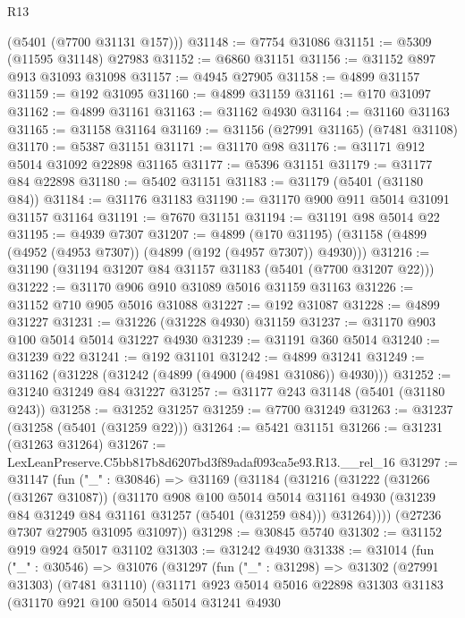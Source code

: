 \begin{lexlean}{R13}
\begin{coremodule}
      (@5401 (@7700 @31131 @157)))
@31148 := @7754 @31086
@31151 := @5309 (@11595 @31148) @27983
@31152 := @6860 @31151
@31156 := @31152 @897 @913 @31093 @31098
@31157 := @4945 @27905
@31158 := @4899 @31157
@31159 := @192 @31095
@31160 := @4899 @31159
@31161 := @170 @31097
@31162 := @4899 @31161
@31163 := @31162 @4930
@31164 := @31160 @31163
@31165 := @31158 @31164
@31169 := @31156 (@27991 @31165) (@7481 @31108)
@31170 := @5387 @31151
@31171 := @31170 @98
@31176 := @31171 @912 @5014 @31092 @22898 @31165
@31177 := @5396 @31151
@31179 := @31177 @84 @22898
@31180 := @5402 @31151
@31183 := @31179 (@5401 (@31180 @84))
@31184 := @31176 @31183
@31190 := @31170 @900 @911 @5014 @31091 @31157 @31164
@31191 := @7670 @31151
@31194 := @31191 @98 @5014 @22
@31195 := @4939 @7307
@31207 := @4899
    (@170 @31195)
    (@31158 (@4899 (@4952 (@4953 @7307)) (@4899 (@192 (@4957 @7307)) @4930)))
@31216 := @31190 (@31194 @31207 @84 @31157 @31183 (@5401 (@7700 @31207 @22)))
@31222 := @31170 @906 @910 @31089 @5016 @31159 @31163
@31226 := @31152 @710 @905 @5016 @31088
@31227 := @192 @31087
@31228 := @4899 @31227
@31231 := @31226 (@31228 @4930) @31159
@31237 := @31170 @903 @100 @5014 @5014 @31227 @4930
@31239 := @31191 @360 @5014
@31240 := @31239 @22
@31241 := @192 @31101
@31242 := @4899 @31241
@31249 := @31162 (@31228 (@31242 (@4899 (@4900 (@4981 @31086)) @4930)))
@31252 := @31240 @31249 @84 @31227
@31257 := @31177 @243 @31148 (@5401 (@31180 @243))
@31258 := @31252 @31257
@31259 := @7700 @31249
@31263 := @31237 (@31258 (@5401 (@31259 @22)))
@31264 := @5421 @31151
@31266 := @31231 (@31263 @31264)
@31267 := LexLeanPreserve.C5bb817b8d6207bd3f89adaf093ca5e93.R13.__rel_16
@31297 := @31147
    (fun ("_" : @30846) =>
    @31169
      (@31184
        (@31216
          (@31222
            (@31266 (@31267 @31087))
            (@31170
              @908
              @100
              @5014
              @5014
              @31161
              @4930
              (@31239 @84 @31249 @84 @31161 @31257 (@5401 (@31259 @84)))
              @31264))))
      (@27236 @7307 @27905 @31095 @31097))
@31298 := @30845 @5740
@31302 := @31152 @919 @924 @5017 @31102
@31303 := @31242 @4930
@31338 := @31014
    (fun ("_" : @30546) =>
    @31076
      (@31297
        (fun ("_" : @31298) =>
        @31302
          (@27991 @31303)
          (@7481 @31110)
          (@31171
            @923
            @5014
            @5016
            @22898
            @31303
            @31183
            (@31170
              @921
              @100
              @5014
              @5014
              @31241
              @4930

\end{coremodule}
\end{lexlean}
